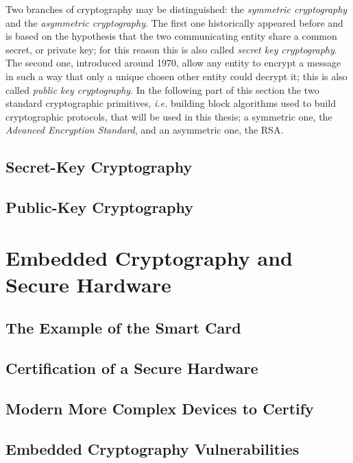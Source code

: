 Two branches of cryptography may be distinguished: the \emph{symmetric cryptography} and the \emph{asymmetric cryptography}. The first one historically appeared before and is based on the hypothesis that the two communicating entity share a common secret, or private key; for this reason this is also called \emph{secret key cryptography}. The second one, introduced around 1970, allow any entity to encrypt a message in such a way that only a unique chosen other entity could decrypt it; this is also called \emph{public key cryptography}. In the following part of this section the two standard cryptographic primitives, \emph{i.e.} building block algorithms used to build cryptographic protocols, that will be used in this thesis; a symmetric one, the \emph{Advanced Encryption Standard}, and an asymmetric one, the RSA. 
\subsection{Secret-Key Cryptography}
\subsection{Public-Key Cryptography}


\section{Embedded Cryptography and Secure Hardware}
\subsection{The Example of the Smart Card}
\subsection{Certification of a Secure Hardware}
\subsection{Modern More Complex Devices to Certify}
\subsection{Embedded Cryptography Vulnerabilities}

